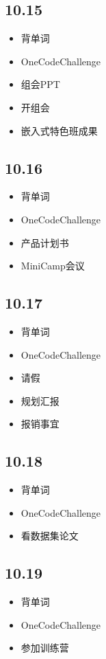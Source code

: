 \documentclass[UTF8]{ctexart}
\begin{document}
\subsection*{10.15}
\begin{itemize}
    \item 背单词
    \item OneCodeChallenge
    \item 组会PPT
    \item 开组会
    \item 嵌入式特色班成果
\end{itemize}

\subsection*{10.16}
\begin{itemize}
    \item 背单词
    \item OneCodeChallenge
    \item 产品计划书
    \item MiniCamp会议
\end{itemize}

\subsection*{10.17}
\begin{itemize}
    \item 背单词
    \item OneCodeChallenge
    \item 请假
    \item 规划汇报
    \item 报销事宜
\end{itemize}

\subsection*{10.18}
\begin{itemize}
    \item 背单词
    \item OneCodeChallenge
    \item 看数据集论文
\end{itemize}

\subsection*{10.19}
\begin{itemize}
    \item 背单词
    \item OneCodeChallenge
    \item 参加训练营
\end{itemize}
\end{document}
